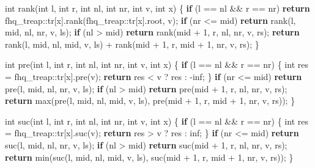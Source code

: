 \documentclass[
]{article}
\newenvironment{Shaded}{}{}
\newcommand{\ControlFlowTok}[1]{\textcolor[rgb]{0.00,0.44,0.13}{\textbf{#1}}}
\newcommand{\DataTypeTok}[1]{\textcolor[rgb]{0.56,0.13,0.00}{#1}}
\newcommand{\DecValTok}[1]{\textcolor[rgb]{0.25,0.63,0.44}{#1}}
\newcommand{\FunctionTok}[1]{\textcolor[rgb]{0.02,0.16,0.49}{#1}}
\newcommand{\NormalTok}[1]{#1}
\begin{document}
\begin{Shaded}
\begin{Highlighting}[]
    \DataTypeTok{int}\NormalTok{ rank(}\DataTypeTok{int}\NormalTok{ l, }\DataTypeTok{int}\NormalTok{ r, }\DataTypeTok{int}\NormalTok{ nl, }\DataTypeTok{int}\NormalTok{ nr, }\DataTypeTok{int}\NormalTok{ v, }\DataTypeTok{int}\NormalTok{ x)}
\NormalTok{    \{}
        \ControlFlowTok{if}\NormalTok{ (l == nl \&\& r == nr)}
            \ControlFlowTok{return}\NormalTok{ fhq\_treap::}\FunctionTok{tr}\NormalTok{[x].rank(fhq\_treap::}\FunctionTok{tr}\NormalTok{[x].root, v);}
        \ControlFlowTok{if}\NormalTok{ (nr \textless{}= mid) }\ControlFlowTok{return}\NormalTok{ rank(l, mid, nl, nr, v, ls);}
        \ControlFlowTok{if}\NormalTok{ (nl \textgreater{} mid) }\ControlFlowTok{return}\NormalTok{ rank(mid + }\DecValTok{1}\NormalTok{, r, nl, nr, v, rs);}
        \ControlFlowTok{return}\NormalTok{ rank(l, mid, nl, mid, v, ls) + rank(mid + }\DecValTok{1}\NormalTok{, r, mid + }\DecValTok{1}\NormalTok{, nr, v, rs);}
\NormalTok{    \}}

    \DataTypeTok{int}\NormalTok{ pre(}\DataTypeTok{int}\NormalTok{ l, }\DataTypeTok{int}\NormalTok{ r, }\DataTypeTok{int}\NormalTok{ nl, }\DataTypeTok{int}\NormalTok{ nr, }\DataTypeTok{int}\NormalTok{ v, }\DataTypeTok{int}\NormalTok{ x)}
\NormalTok{    \{}
        \ControlFlowTok{if}\NormalTok{ (l == nl \&\& r == nr)}
\NormalTok{        \{}
            \DataTypeTok{int}\NormalTok{ res = fhq\_treap::}\FunctionTok{tr}\NormalTok{[x].pre(v);}
            \ControlFlowTok{return}\NormalTok{ res \textless{} v ? res : {-}inf;}
\NormalTok{        \}}
        \ControlFlowTok{if}\NormalTok{ (nr \textless{}= mid) }\ControlFlowTok{return}\NormalTok{ pre(l, mid, nl, nr, v, ls);}
        \ControlFlowTok{if}\NormalTok{ (nl \textgreater{} mid) }\ControlFlowTok{return}\NormalTok{ pre(mid + }\DecValTok{1}\NormalTok{, r, nl, nr, v, rs);}
        \ControlFlowTok{return}\NormalTok{ max(pre(l, mid, nl, mid, v, ls), pre(mid + }\DecValTok{1}\NormalTok{, r, mid + }\DecValTok{1}\NormalTok{, nr, v, rs));}
\NormalTok{    \}}

    \DataTypeTok{int}\NormalTok{ suc(}\DataTypeTok{int}\NormalTok{ l, }\DataTypeTok{int}\NormalTok{ r, }\DataTypeTok{int}\NormalTok{ nl, }\DataTypeTok{int}\NormalTok{ nr, }\DataTypeTok{int}\NormalTok{ v, }\DataTypeTok{int}\NormalTok{ x)}
\NormalTok{    \{}
        \ControlFlowTok{if}\NormalTok{ (l == nl \&\& r == nr)}
\NormalTok{        \{}
            \DataTypeTok{int}\NormalTok{ res = fhq\_treap::}\FunctionTok{tr}\NormalTok{[x].suc(v);}
            \ControlFlowTok{return}\NormalTok{ res \textgreater{} v ? res : inf;}
\NormalTok{        \}}
        \ControlFlowTok{if}\NormalTok{ (nr \textless{}= mid) }\ControlFlowTok{return}\NormalTok{ suc(l, mid, nl, nr, v, ls);}
        \ControlFlowTok{if}\NormalTok{ (nl \textgreater{} mid) }\ControlFlowTok{return}\NormalTok{ suc(mid + }\DecValTok{1}\NormalTok{, r, nl, nr, v, rs);}
        \ControlFlowTok{return}\NormalTok{ min(suc(l, mid, nl, mid, v, ls), suc(mid + }\DecValTok{1}\NormalTok{, r, mid + }\DecValTok{1}\NormalTok{, nr, v, rs));}
\NormalTok{    \}}


\end{Highlighting}
\end{Shaded}
\end{document}

